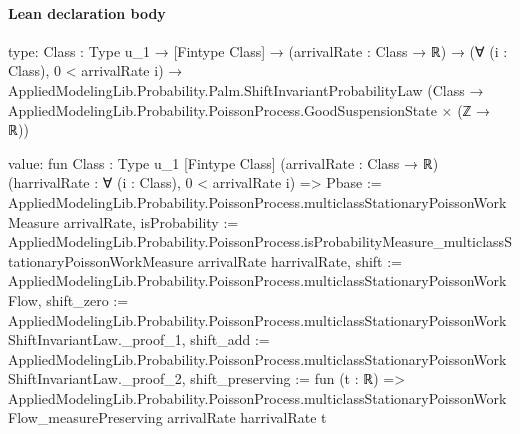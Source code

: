 \documentclass[10pt]{article}
\begin{document}
\paragraph{Lean declaration body}
\begin{ReviewVerbatim}
type:
{Class : Type u_1} →
  [Fintype Class] →
    (arrivalRate : Class → ℝ) →
      (∀ (i : Class), 0 < arrivalRate i) →
        AppliedModelingLib.Probability.Palm.ShiftInvariantProbabilityLaw
          (Class → AppliedModelingLib.Probability.PoissonProcess.GoodSuspensionState × (ℤ → ℝ))

value:
fun {Class : Type u_1} [Fintype Class] (arrivalRate : Class → ℝ) (harrivalRate : ∀ (i : Class), 0 < arrivalRate i) =>
  { Pbase := AppliedModelingLib.Probability.PoissonProcess.multiclassStationaryPoissonWorkMeasure arrivalRate,
    isProbability :=
      AppliedModelingLib.Probability.PoissonProcess.isProbabilityMeasure_multiclassStationaryPoissonWorkMeasure
        arrivalRate harrivalRate,
    shift := AppliedModelingLib.Probability.PoissonProcess.multiclassStationaryPoissonWorkFlow,
    shift_zero :=
      AppliedModelingLib.Probability.PoissonProcess.multiclassStationaryPoissonWorkShiftInvariantLaw._proof_1,
    shift_add :=
      AppliedModelingLib.Probability.PoissonProcess.multiclassStationaryPoissonWorkShiftInvariantLaw._proof_2,
    shift_preserving := fun (t : ℝ) =>
      AppliedModelingLib.Probability.PoissonProcess.multiclassStationaryPoissonWorkFlow_measurePreserving arrivalRate
        harrivalRate t }
\end{ReviewVerbatim}
\end{document}
